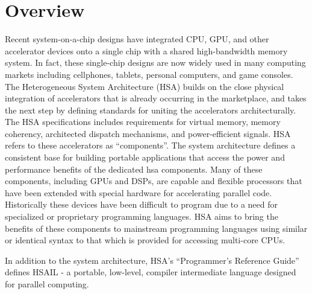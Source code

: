 \hypertarget{index_overview}{}\section{Overview}\label{index_overview}

Recent system-on-a-chip designs have integrated CPU, GPU, and other
accelerator devices onto a single chip with a shared high-bandwidth
memory system.  In fact, these single-chip designs are now widely
used in many computing markets including cellphones, tablets,
personal computers, and game consoles. The Heterogeneous System
Architecture (HSA) builds on the close physical integration of
accelerators that is already occurring in the marketplace, and takes
the next step by defining standards for uniting the accelerators
architecturally.  The HSA specifications includes requirements for
virtual memory, memory coherency, architected dispatch mechanisms,
and power-efficient signals.   
HSA refers to these accelerators as “components”.  The system
architecture defines a consistent base for building portable
applications that access the power and performance benefits of the
dedicated hsa components.   Many of these components, including GPUs
and DSPs, are capable and flexible processors that have been
extended with special hardware for accelerating parallel code.
Historically these devices have been difficult to program due to a
need for specialized or proprietary programming languages.  HSA aims
to bring the benefits of these components to mainstream programming
languages using similar or identical syntax to that which is
provided for accessing multi-core CPUs.

In addition to the system architecture, HSA’s “Programmer’s
Reference Guide” defines HSAIL - a portable, low-level, compiler
intermediate language designed for parallel computing.  

